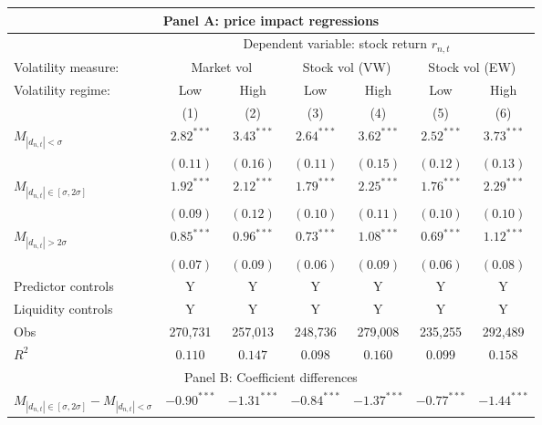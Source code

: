 \begin{tabular}{lcccccc}
  \hline \multicolumn{7}{c}{Panel A: price impact regressions} \\
 \hline
                                    & \multicolumn{6}{c}{Dependent variable: stock return $r_{n,t}$} \\

                                    \cmidrule(l){2-7} Volatility measure: & \multicolumn{2}{c}{Market vol} & \multicolumn{2}{c}{Stock vol (VW)} & \multicolumn{2}{c}{Stock vol (EW)} \\
 \cmidrule(l){2-3} \cmidrule(l){4-5} \cmidrule(l){6-7} Volatility regime: & Low & High & Low & High & Low & High \\
 \cmidrule(l){2-3} \cmidrule(l){4-5} \cmidrule(l){6-7} 
  & (1) & (2) & (3) & (4) & (5) & (6) \\ 
  $M_{|d_{n,t}| < \sigma}$ & $2.82^{***}$ & $3.43^{***}$ & $2.64^{***}$ & $3.62^{***}$ & $2.52^{***}$ & $3.73^{***}$ \\ 
   & $(0.11)$ & $(0.16)$ & $(0.11)$ & $(0.15)$ & $(0.12)$ & $(0.13)$ \\ 
  $M_{|d_{n,t}| \in [\sigma, 2\sigma]}$ & $1.92^{***}$ & $2.12^{***}$ & $1.79^{***}$ & $2.25^{***}$ & $1.76^{***}$ & $2.29^{***}$ \\ 
   & $(0.09)$ & $(0.12)$ & $(0.10)$ & $(0.11)$ & $(0.10)$ & $(0.10)$ \\ 
  $M_{|d_{n,t}| > 2 \sigma}$ & $0.85^{***}$ & $0.96^{***}$ & $0.73^{***}$ & $1.08^{***}$ & $0.69^{***}$ & $1.12^{***}$ \\ 
   \vspace{5pt} & $(0.07)$ & $(0.09)$ & $(0.06)$ & $(0.09)$ & $(0.06)$ & $(0.08)$ \\ 
  Predictor controls & Y & Y & Y & Y & Y & Y \\ 
   \vspace{5pt}Liquidity controls & Y & Y & Y & Y & Y & Y \\ 
  Obs & 270,731 & 257,013 & 248,736 & 279,008 & 235,255 & 292,489 \\ 
  $R^2$ & $0.110$ & $0.147$ & $0.098$ & $0.160$ & $0.099$ & $0.158$ \\ 
   \hline \multicolumn{7}{c}{Panel B: Coefficient differences} \\
 \hline$M_{|d_{n,t}| \in [\sigma, 2\sigma]} - M_{|d_{n,t}| < \sigma}$ & $-0.90^{***}$ & $-1.31^{***}$ & $-0.84^{***}$ & $-1.37^{***}$ & $-0.77^{***}$ & $-1.44^{***}$ \\ 

\end{tabular}
